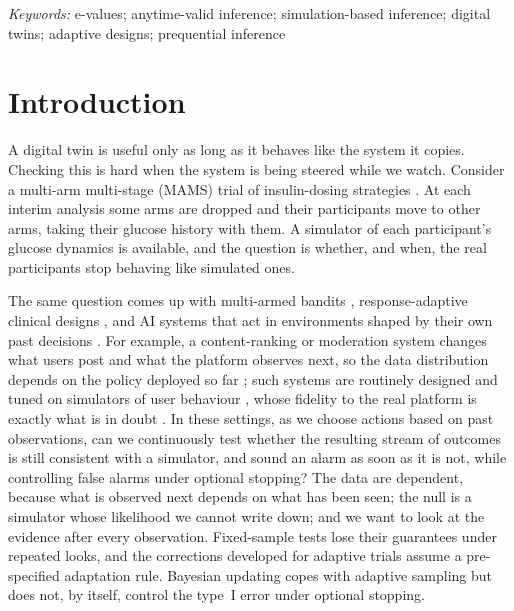 \documentclass[12pt]{article}
\theoremstyle{remark}
\def\spacingset#1{\renewcommand{\baselinestretch}%
{#1}\small\normalsize} \spacingset{1}
\begin{document}
\noindent%
{\it Keywords:} e-values; anytime-valid inference; simulation-based inference;
digital twins; adaptive designs; prequential inference
\vfill

\newpage
\spacingset{1.45}
\section{Introduction}\label{sec:intro}

A digital twin is useful only as long as it behaves like the system it
copies. Checking this is hard when the system is being steered while we
watch. Consider a multi-arm multi-stage (MAMS) trial of insulin-dosing
strategies \citep{whitehead1997design,magirr2012generalized}. At each interim
analysis some arms are dropped and their participants move to other arms,
taking their glucose history with them. A simulator of each participant's
glucose dynamics is available, and the question is whether, and when, the
real participants stop behaving like simulated ones.

The same question comes up with multi-armed bandits
\citep{lattimore2020bandit}, response-adaptive clinical designs
\citep{trippa2012bayesian,villar2015multi}, and AI systems that act in
environments shaped by their own past decisions
\citep{perdomo2020performative,dulacarnold2021challenges}. For example, a
content-ranking or moderation system changes what users post and what the
platform observes next, so the data distribution depends on the policy
deployed so far \citep{chaney2018algorithmic,jiang2019degenerate}; such
systems are routinely designed and tuned on simulators of user behaviour
\citep{ie2019recsim,shi2019virtual}, whose fidelity to the real platform is
exactly what is in doubt \citep{zhao2020sim}. In these settings, as we choose
actions based on past observations, can we continuously test whether the
resulting stream of outcomes is still consistent with a simulator, and sound
an alarm as soon as it is not, while controlling false alarms under optional
stopping? The data are dependent, because what is observed next depends on
what has been seen; the null is a simulator whose likelihood we
cannot write down; and we want to look at the evidence after
every observation. Fixed-sample tests lose
their guarantees under repeated looks, and the corrections developed for
adaptive trials \citep{bowden2017unbiased,magirr2012generalized} assume a
pre-specified adaptation rule. Bayesian updating copes with adaptive sampling
but does not, by itself, control the type~I error under optional stopping.
\end{document}
